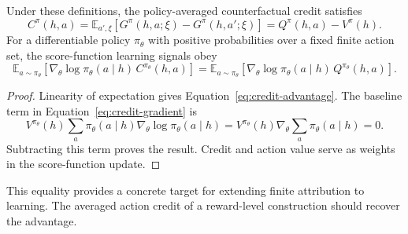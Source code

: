 \begin{proposition}
Under these definitions, the policy-averaged counterfactual credit satisfies
\begin{equation}
C^\pi(h,a)
=\mathbb E_{a',\xi}\!\left[G^\pi(h,a;\xi)-G^\pi(h,a';\xi)\right]
=Q^\pi(h,a)-V^\pi(h).
\label{eq:credit-advantage}
\end{equation}
For a differentiable policy $\pi_\theta$ with positive probabilities over a fixed finite action set, the score-function learning signals obey
\begin{equation}
\mathbb E_{a\sim\pi_\theta}\!\left[\nabla_\theta\log\pi_\theta(a\mid h)\,C^{\pi_\theta}(h,a)\right]
=\mathbb E_{a\sim\pi_\theta}\!\left[\nabla_\theta\log\pi_\theta(a\mid h)\,Q^{\pi_\theta}(h,a)\right].
\label{eq:credit-gradient}
\end{equation}
\end{proposition}
\begin{proof}
Linearity of expectation gives Equation~\ref{eq:credit-advantage}. The baseline term in Equation~\ref{eq:credit-gradient} is
\begin{equation}
V^{\pi_\theta}(h)\sum_a\pi_\theta(a\mid h)\nabla_\theta\log\pi_\theta(a\mid h)
=V^{\pi_\theta}(h)\nabla_\theta\sum_a\pi_\theta(a\mid h)=0.
\end{equation}
Subtracting this term proves the result. Credit and action value serve as weights in the score-function update.
\end{proof}

This equality provides a concrete target for extending finite attribution to learning. The averaged action credit of a reward-level construction should recover the advantage.

